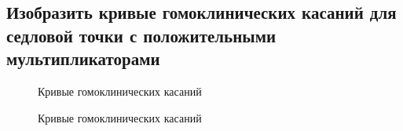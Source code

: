 \documentclass[12pt, a4paper]{article}
\begin{document}
\subsection{Изобразить кривые гомоклинических касаний для седловой точки с положительными мультипликаторами}
\begin{figure}[H]
	\caption{Кривые гомоклинических касаний}
\end{figure}
\begin{figure}[H]
	\caption{Кривые гомоклинических касаний}
\end{figure}
\end{document}

